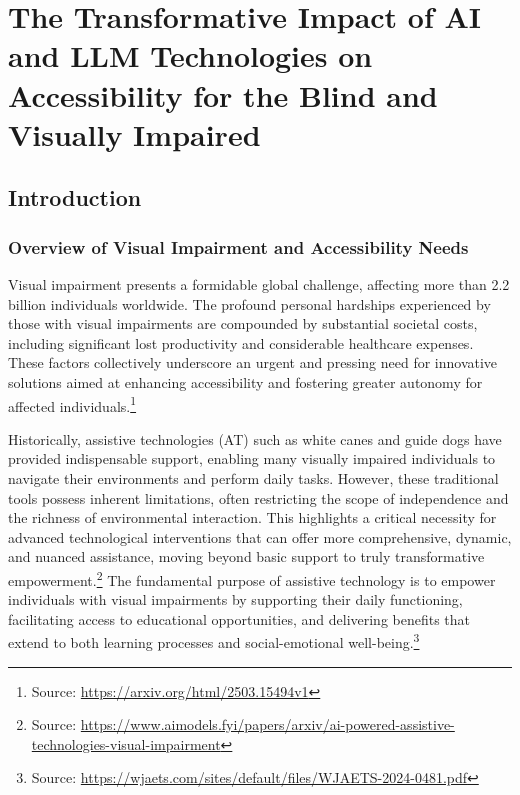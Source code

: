 \chapter{The Transformative Impact of AI and LLM Technologies on Accessibility for the Blind and Visually Impaired}
\label{chap:ai-llm-accessibility}

\section{Introduction}
\label{sec:introduction}

\subsection{Overview of Visual Impairment and Accessibility Needs}

Visual impairment presents a formidable global challenge, affecting more than 2.2 billion individuals worldwide. The profound personal hardships experienced by those with visual impairments are compounded by substantial societal costs, including significant lost productivity and considerable healthcare expenses. These factors collectively underscore an urgent and pressing need for innovative solutions aimed at enhancing accessibility and fostering greater autonomy for affected individuals.\footnote{Source: \url{https://arxiv.org/html/2503.15494v1}}

Historically, assistive technologies (AT) such as white canes and guide dogs have provided indispensable support, enabling many visually impaired individuals to navigate their environments and perform daily tasks. However, these traditional tools possess inherent limitations, often restricting the scope of independence and the richness of environmental interaction. This highlights a critical necessity for advanced technological interventions that can offer more comprehensive, dynamic, and nuanced assistance, moving beyond basic support to truly transformative empowerment.\footnote{Source: \url{https://www.aimodels.fyi/papers/arxiv/ai-powered-assistive-technologies-visual-impairment}} The fundamental purpose of assistive technology is to empower individuals with visual impairments by supporting their daily functioning, facilitating access to educational opportunities, and delivering benefits that extend to both learning processes and social-emotional well-being.\footnote{Source: \url{https://wjaets.com/sites/default/files/WJAETS-2024-0481.pdf}}

